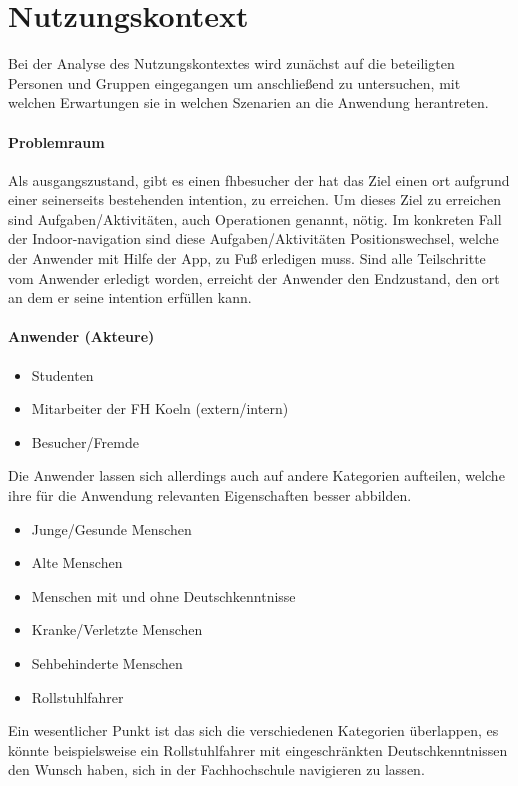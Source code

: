 \chapter{Nutzungskontext}
Bei der Analyse des Nutzungskontextes wird zunächst auf die beteiligten Personen und Gruppen eingegangen um anschließend zu untersuchen, mit welchen Erwartungen sie in welchen Szenarien an die Anwendung herantreten.

\subsubsection*{Problemraum}
Als \gls{ausgang}szustand, gibt es einen \gls{fhbesucher} der hat das Ziel einen \gls{ort} aufgrund einer seinerseits bestehenden \gls{intention}, zu erreichen. Um dieses Ziel zu erreichen sind Aufgaben/Aktivitäten, auch Operationen genannt, nötig. Im konkreten Fall der Indoor-\gls{navigation} sind diese Aufgaben/Aktivitäten Positionswechsel, welche der Anwender mit Hilfe der App, zu Fuß erledigen muss. Sind alle Teilschritte vom Anwender erledigt worden, erreicht der Anwender den Endzustand, den \gls{ort} an dem er seine \gls{intention} erfüllen kann.

\subsubsection*{Anwender (Akteure)}
\begin{itemize}
  \item Studenten
  \item Mitarbeiter der FH Koeln (extern/intern)
  \item Besucher/Fremde
\end{itemize}

\noindent
Die Anwender lassen sich allerdings auch auf andere Kategorien aufteilen, welche ihre für die Anwendung relevanten Eigenschaften besser abbilden.
\begin{itemize}
  \item Junge/Gesunde Menschen
  \item Alte Menschen
  \item Menschen mit und ohne Deutschkenntnisse
  \item Kranke/Verletzte Menschen
  \item Sehbehinderte Menschen
  \item Rollstuhlfahrer
\end{itemize}

\noindent
Ein wesentlicher Punkt ist das sich die verschiedenen Kategorien überlappen, es könnte beispielsweise ein Rollstuhlfahrer mit eingeschränkten Deutschkenntnissen den Wunsch haben, sich in der Fachhochschule navigieren zu lassen.

